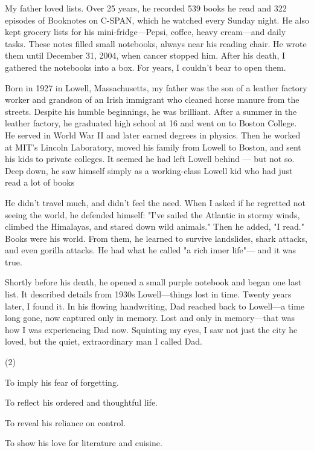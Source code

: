 \documentclass{英语试卷}
\begin{document}
\par My father loved lists. Over 25 years, he recorded 539 books he read and 322 episodes of Booknotes on C-SPAN, which he watched every Sunday night. He also kept grocery lists for his mini-fridge—Pepsi, coffee, heavy cream—and daily tasks. These notes filled small notebooks, always near his reading chair. He wrote them until December 31, 2004, when cancer stopped him. After his death, I gathered the notebooks into a box. For years, I couldn't bear to open them.\par
\par Born in 1927 in Lowell, Massachusetts, my father was the son of a leather factory worker and grandson of an Irish immigrant who cleaned horse manure from the streets. Despite his humble beginnings, he was brilliant. After a summer in the leather factory, he graduated high school at 16 and went on to Boston College. He served in World War II and later earned degrees in physics. Then he worked at MIT's Lincoln Laboratory, moved his family from Lowell to Boston, and sent his kids to private colleges. It seemed he had left Lowell behind — but not so. Deep down, he saw himself simply as a working-class Lowell kid who had just read a lot of books\par
\par He didn't travel much, and didn't feel the need. When I asked if he regretted not seeing the world, he defended himself: "I've sailed the Atlantic in stormy winds, climbed the Himalayas, and stared down wild animals." Then he added, "I read." Books were his world. From them, he learned to survive landslides, shark attacks, and even gorilla attacks. He had what he called "a rich inner life"— and it was true.\par
\par Shortly before his death, he opened a small purple notebook and began one last list. It described details from 1930s Lowell—things lost in time. Twenty years later, I found it. In his flowing handwriting, Dad reached back to Lowell—a time long gone, now captured only in memory. Lost and only in memory—that was how I was experiencing Dad now. Squinting my eyes, I saw not just the city he loved, but the quiet, extraordinary man I called Dad.\par
{}
\begin{choices}(2)
  \item To imply his fear of forgetting.
  \item To reflect his ordered and thoughtful life.
  \item To reveal his reliance on control.
  \item To show his love for literature and cuisine.
\end{choices}
\end{document}
